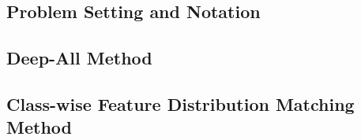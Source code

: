 \subsection{Problem Setting and Notation}

\subsection{Deep-All Method}

\subsection{Class-wise Feature Distribution Matching Method}